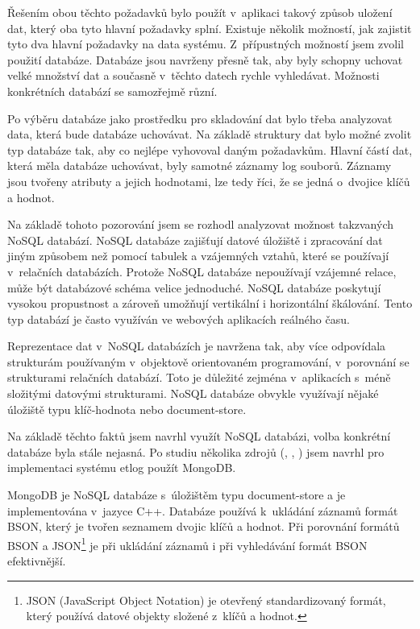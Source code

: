 \documentclass[thesis=M,czech]{FITthesis}[2012/06/26]
\begin{document}
  Řešením obou těchto požadavků bylo použít v~aplikaci takový způsob uložení dat,
  který oba tyto hlavní požadavky splní.
  Existuje několik možností, jak zajistit tyto dva hlavní požadavky na data systému.
  Z~přípustných možností jsem zvolil použití databáze.
  Databáze jsou navrženy přesně tak, aby byly schopny uchovat velké množství dat a současně v~těchto datech rychle vyhledávat.
  Možnosti konkrétních databází se samozřejmě různí.
  
  Po výběru databáze jako prostředku pro skladování dat bylo třeba analyzovat data, která bude databáze uchovávat.
  Na základě struktury dat bylo možné zvolit typ databáze tak, aby co nejlépe vyhovoval daným požadavkům.
  Hlavní částí dat, která měla databáze uchovávat, byly samotné záznamy log souborů.
  Záznamy jsou tvořeny atributy a jejich hodnotami, lze tedy říci,
  že se jedná o~dvojice klíčů a hodnot.

  Na základě tohoto pozorování jsem se rozhodl analyzovat
  možnost takzvaných NoSQL databází.
  NoSQL databáze zajišťují datové úložiště i zpracování dat jiným způsobem než
  pomocí tabulek a vzájemných vztahů, které se používají v~relačních databázích.
  Protože NoSQL databáze nepoužívají vzájemné relace,
  může být databázové schéma velice jednoduché.
  NoSQL databáze poskytují vysokou propustnost a zároveň
  umožňují vertikální i horizontální škálování.
  Tento typ databází je často využíván ve webových aplikacích reálného času.\cite{nosql}

  Reprezentace dat v~NoSQL databázích je navržena tak,
  aby více odpovídala strukturám používaným
  v~objektově orientovaném programování, v~porovnání se strukturami relačních databází.
  Toto je důležité zejména v~aplikacích s~méně složitými datovými strukturami.
  NoSQL databáze obvykle využívají nějaké úložiště typu klíč-hodnota nebo document-store.\cite{nosql}

  Na základě těchto faktů jsem navrhl využít NoSQL databázi,
  volba konkrétní databáze byla stále nejasná.
  Po studiu několika zdrojů (\cite{nosql}, \cite{db_comparsion}, \cite{db_comparsion2})
  jsem navrhl pro implementaci systému etlog použít MongoDB.

  MongoDB je NoSQL databáze s~úložištěm typu document-store a je implementována v~jazyce C++.
  Databáze používá k~ukládání záznamů formát BSON, který je tvořen seznamem dvojic klíčů a hodnot.
  Při porovnání formátů BSON a JSON\footnote{
    JSON (JavaScript Object Notation) je otevřený standardizovaný formát, který používá datové objekty složené z~klíčů a hodnot.
  }
  je při ukládání záznamů i při vyhledávání formát BSON efektivnější. \cite{db_comparsion2}
\end{document}

